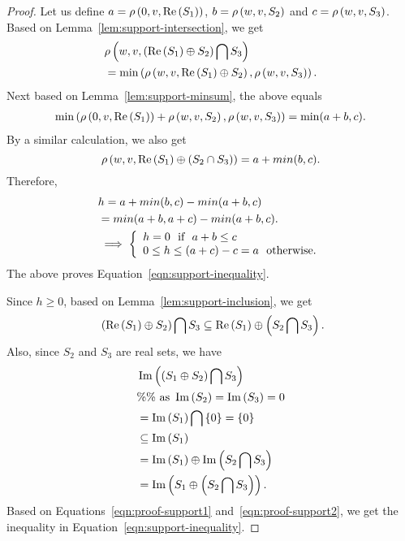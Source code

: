 %
\begin{proof}
Let us
define $a = \rho\left(0,v,\operatorname{Re}\left(S_1\right)\right)$, $b=\rho\left(w,v,S_2\right)$
and $c = \rho\left(w,v,S_3\right)$.  
Based on Lemma~\ref{lem:support-intersection}, we get
%
\begin{align*}
& \rho\left(w,v,\left(\operatorname{Re}\left(S_1\right)\oplus S_2\right)\bigcap
  S_3\right)\\
& = \min\left(\rho\left(w,v,\operatorname{Re}\left(S_1\right)\oplus
    S_2\right),\rho\left(w,v,S_3\right)\right).
\end{align*}
%
Next based on Lemma~\ref{lem:support-minsum}, the above equals
\begin{align*}
\min\left(\rho\left(0,v,\operatorname{Re}\left(S_1\right)\right)+\rho\left(w,v,S_2\right),\rho\left(w,v,S_3\right)\right)
= \min(a+b,c).
\end{align*}
%
  By a similar calculation, we also get
%
\[
\rho\left(w,v,\operatorname{Re}\left(S_1\right)\oplus\left(S_2\cap S_3\right)\right) =
a+min(b,c).  
\]
%
Therefore, 
%
\begin{align}
& h = a+min(b,c)-min(a+b,c)\nonumber\\
& = min(a+b,a+c)-min(a+b,c).\nonumber\\
& \implies \left\{\begin{array}{l}
h=0~~\text{if}~~a+b\leq c\\
0\leq h\leq (a+c)-c = a~~\text{otherwise}.
\end{array}
\right.
\end{align}
%
The above proves Equation~\ref{eqn:support-inequality}.

Since $h\geq0$, based on Lemma~\ref{lem:support-inclusion}, we get
%
\begin{equation}~\label{eqn:proof-support1}
\left(\operatorname{Re}\left(S_1\right)\oplus S_2\right)\bigcap S_3\subseteq \operatorname{Re}\left(S_1\right)\oplus\left(S_2\bigcap S_3\right).
\end{equation}
%
Also, since $S_2$ and $S_3$ are real sets, we have
%
\begin{align}
& \operatorname{Im}\left(\left(S_1\oplus S_2\right)\bigcap S_3\right)\\
& \%\%~\text{as}~\operatorname{Im}\left(S_2\right)=\operatorname{Im}\left(S_3\right)=0\nonumber\\
& = \operatorname{Im}\left(S_1\right)\bigcap \left\{0\right\}=\left\{0\right\}\nonumber\\
& \subseteq
\operatorname{Im}\left(S_1\right)\nonumber\\
& =
\operatorname{Im}\left(S_1\right)\oplus\operatorname{Im}\left(S_2\bigcap S_3\right)\\
& = \operatorname{Im}\left(S_1\oplus\left(S_2\bigcap S_3\right)\right).~\label{eqn:proof-support2}
\end{align}
%
Based on Equations~\ref{eqn:proof-support1} and~\ref{eqn:proof-support2}, we
get the inequality in Equation~\ref{eqn:support-inequality}.
\end{proof}
